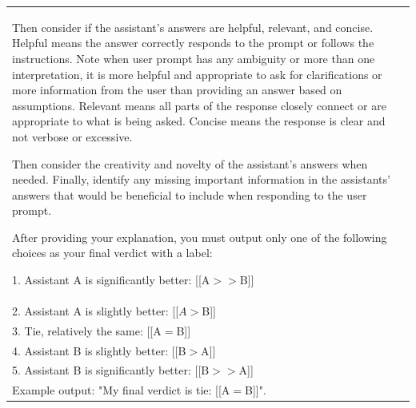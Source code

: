 \begin{table}[h]
\begin{tabular}{p{}}
Then consider if the assistant's answers are helpful, relevant, and concise. Helpful means the answer correctly responds to the prompt or follows the instructions. Note when user prompt has any ambiguity or more than one interpretation, it is more helpful and appropriate to ask for clarifications or more information from the user than providing an answer based on assumptions. Relevant means all parts of the response closely connect or are appropriate to what is being asked. Concise means the response is clear and not verbose or excessive.

Then consider the creativity and novelty of the assistant's answers when needed. Finally, identify any missing important information in the assistants' answers that would be beneficial to include when responding to the user prompt.

After providing your explanation, you must output only one of the following choices as your final verdict with a label:

1. Assistant A is significantly better: [[A$>>$B]]\\
2. Assistant A is slightly better: [[$A>$B]]\\
3. Tie, relatively the same: [[A$=$B]]\\
4. Assistant B is slightly better: [[B$>$A]]\\
5. Assistant B is significantly better: [[B$>>$A]]\\

Example output: "My final verdict is tie: [[A$=$B]]". \\ \hline
    \end{tabular}
\end{table}


